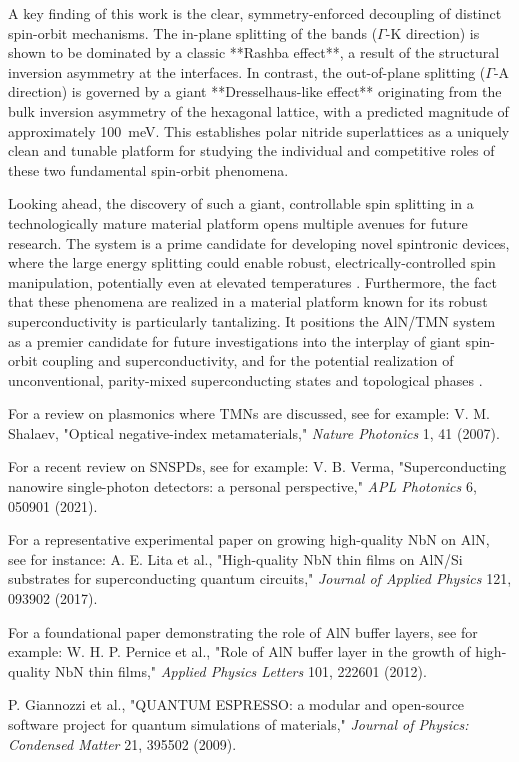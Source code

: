\documentclass[aps,prl,reprint,superscriptaddress]{revtex4-2}
\begin{document}
A key finding of this work is the clear, symmetry-enforced decoupling of
distinct spin-orbit mechanisms. The in-plane splitting of the bands ($\Gamma$-K
direction) is shown to be dominated by a classic **Rashba effect**, a result of
the structural inversion asymmetry at the interfaces. In contrast, the
out-of-plane splitting ($\Gamma$-A direction) is governed by a giant
**Dresselhaus-like effect** originating from the bulk inversion asymmetry of
the hexagonal lattice, with a predicted magnitude of approximately 100~meV.
This establishes polar nitride superlattices as a uniquely clean and tunable
platform for studying the individual and competitive roles of these two
fundamental spin-orbit phenomena.

Looking ahead, the discovery of such a giant, controllable spin splitting in a
technologically mature material platform opens multiple avenues for future
research. The system is a prime candidate for developing novel spintronic
devices, where the large energy splitting could enable robust,
electrically-controlled spin manipulation, potentially even at elevated
temperatures \cite{zutic_spintronics_2004}. Furthermore, the fact that these
phenomena are realized in a material platform known for its robust
superconductivity is particularly tantalizing. It positions the AlN/TMN system
as a premier candidate for future investigations into the interplay of giant
spin-orbit coupling and superconductivity, and for the potential realization of
unconventional, parity-mixed superconducting states and topological phases
\cite{sato_topological_2017}.



\begin{thebibliography}{9}

 For a review on plasmonics where TMNs are
discussed, see for example: V. M. Shalaev, "Optical negative-index
metamaterials," \textit{Nature Photonics} 1, 41 (2007).

 For a recent review on SNSPDs, see for
example: V. B. Verma, "Superconducting nanowire single-photon detectors: a
personal perspective," \textit{APL Photonics} 6, 050901 (2021).

 For a representative experimental paper on
growing high-quality NbN on AlN, see for instance: A. E. Lita et al.,
"High-quality NbN thin films on AlN/Si substrates for superconducting quantum
circuits," \textit{Journal of Applied Physics} 121, 093902 (2017).

 For a foundational paper demonstrating the role of
AlN buffer layers, see for example: W. H. P. Pernice et al., "Role of AlN
buffer layer in the growth of high-quality NbN thin films," \textit{Applied
Physics Letters} 101, 222601 (2012).

 P. Giannozzi et al., "QUANTUM ESPRESSO: a
modular and open-source software project for quantum simulations of materials,"
\textit{Journal of Physics: Condensed Matter} 21, 395502 (2009).

\end{thebibliography}
\end{document}
